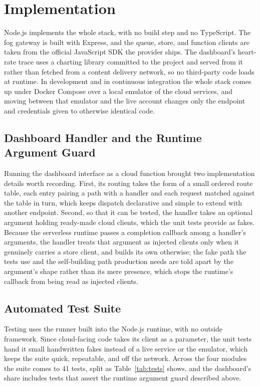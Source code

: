 \documentclass[conference]{IEEEtran}
\begin{document}
\section{Implementation}

Node.js implements the whole stack, with no build step and no TypeScript. The fog gateway is built with Express, and the queue, store, and function clients are taken from the official JavaScript SDK the provider ships. The dashboard's heart-rate trace uses a charting library committed to the project and served from it rather than fetched from a content delivery network, so no third-party code loads at runtime. In development and in continuous integration the whole stack comes up under Docker Compose over a local emulator of the cloud services, and moving between that emulator and the live account changes only the endpoint and credentials given to otherwise identical code.

\subsection{Dashboard Handler and the Runtime Argument Guard}

Running the dashboard interface as a cloud function brought two implementation details worth recording. First, its routing takes the form of a small ordered route table, each entry pairing a path with a handler and each request matched against the table in turn, which keeps dispatch declarative and simple to extend with another endpoint. Second, so that it can be tested, the handler takes an optional argument holding ready-made cloud clients, which the unit tests provide as fakes. Because the serverless runtime passes a completion callback among a handler's arguments, the handler treats that argument as injected clients only when it genuinely carries a store client, and builds its own otherwise; the fake path the tests use and the self-building path production needs are told apart by the argument's shape rather than its mere presence, which stops the runtime's callback from being read as injected clients.

\subsection{Automated Test Suite}

Testing uses the runner built into the Node.js runtime, with no outside framework. Since cloud-facing code takes its client as a parameter, the unit tests hand it small handwritten fakes instead of a live service or the emulator, which keeps the suite quick, repeatable, and off the network. Across the four modules the suite comes to 41 tests, split as Table~\ref{tab:tests} shows, and the dashboard's share includes tests that assert the runtime argument guard described above.
\end{document}

